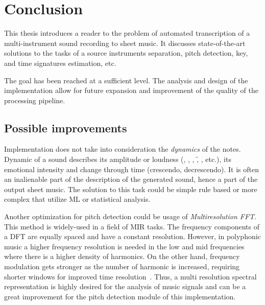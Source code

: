 \chapter{Conclusion}\label{ch:conclusion}

This thesis introduces a reader to the problem of automated transcription of a multi-instrument sound recording to
sheet music. It discusses state-of-the-art solutions to the tasks of a source instruments separation, pitch
detection, key, and time signatures estimation, etc.

The goal has been reached at a sufficient level. The analysis and design of the implementation allow for future
expansion and improvement of the quality of the processing pipeline.

\section{Possible improvements}\label{sec:possible-improvements}

Implementation does not take into consideration the \textit{dynamics} of the notes. Dynamic of a sound describes its
amplitude or loudness (\pp, \p, \mf, \f, \ff, etc.), its emotional intensity and change through time (crescendo,
decrescendo). It is often an inalienable part of the description of the generated sound, hence a part of the output
sheet music. The solution to this task could be simple rule based or more complex that utilize \ac{ML} or statistical
analysis.

Another optimization for pitch detection could be usage of \textit{Multiresolution \ac{FFT}}. This method is widely-used
in a field of \ac{MIR} tasks. The frequency components of a \ac{DFT} are equally spaced and have a constant resolution.
However, in polyphonic music a higher frequency resolution is needed in the low and mid frequencies where there is
a higher density of harmonics. On the other hand, frequency modulation gets stronger as the number of harmonic is
increased, requiring shorter windows for improved time resolution~\cite{cancela2009efficient}. Thus, a multi resolution
spectral representation is highly desired for the analysis of music signals and can be a great improvement for the pitch
detection module of this implementation.